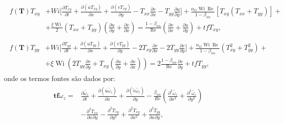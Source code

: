 \begin{gather}
    \begin{aligned}
        f(\mathbf{T})T_{xy} & + Wi\bigg[\frac{\partial T_{xy}}{\partial t} + \frac{\partial (uT_{xy})} {\partial x} + \frac{\partial (vT_{xy})}{\partial y} - T_{xx}\frac{\partial v}{\partial x} - T_{yy}\frac{\partial u}{\partial y}\bigg] + \frac{\alpha_{G}\operatorname{Wi}\operatorname{Re}}{1-\beta_{nn}}\left[T_{xy}\left(T_{xx} + T_{yy}\right)\right] + \\ 
        & + \frac{\xi\operatorname{Wi}}{2}\left(T_{xx} + T_{yy}\right)\left(\frac{\partial u}{\partial y} + \frac{\partial v}{\partial x}\right) = \frac{1-\beta_{nn}}{\operatorname{Re}}\left(\frac{\partial v}{\partial x} + \frac{\partial u}{\partial y}\right)+ tfT_{xy},
    \end{aligned}
    \label{eq_lpog_txy_source_term_1}
\end{gather}
\begin{gather}
    \begin{aligned}
        f(\mathbf{T})T_{yy} &+ Wi\bigg[\frac{\partial T_{yy}}{\partial t} + \frac{\partial (uT_{yy})}{\partial x} + \frac{\partial (vT_{yy})}{\partial y} - 2T_{xy}\frac{\partial v}{\partial x} - 2T_{yy}\frac{\partial v}{\partial y}\bigg] + \frac{\alpha_{G}\operatorname{Wi}\operatorname{Re}}{1-\beta_{nn}}\left(T_{xy}^{2} + T_{yy}^{2}\right) + \\ & + \xi\operatorname{Wi}\left(2T_{yy}\frac{\partial v}{\partial y} + T_{xy}\left(\frac{\partial u}{\partial y} + \frac{\partial v}{\partial x}\right)\right) = 2\frac{1-\beta_{nn}}{\operatorname{Re}}\frac{\partial v}{\partial y}+ tfT_{yy},
    \end{aligned}
    \label{eq_lpog_tyy_source_term_1}
\end{gather}
onde os termos fontes são dados por:
\begin{gather}
    \begin{aligned}
        \mathbf{tf}\omega_{z} = & \frac{\partial \widetilde{\omega_{z}}}{\partial t} + \frac{\partial (\overline{u}\widetilde{\omega_{z}})}{\partial x} + \frac{\partial (\widetilde{v}\widetilde{\omega_{z}})}{\partial y} - \frac{\beta_{nn}}{Re}\left(\frac{\partial^{2} \widetilde{\omega_{z}}}{\partial x^{2}} + \frac{\partial^{2} \widetilde{\omega_{z}}}{\partial y^{2}}\right) \\ & - \frac{\partial^{2}\overline{T}_{xx}}{\partial x^{}\partial y^{}} - \frac{\partial^{2}\overline{T}_{xy}}{\partial y^{2}} + \frac{\partial^{2}\overline{T}_{xy}}{\partial x^{2}} + \frac{\partial^{2}\overline{T}_{yy}}{\partial x^{}\partial y^{}} ,
    \end{aligned}
    \label{eq_wz_s_t_2}
\end{gather}
